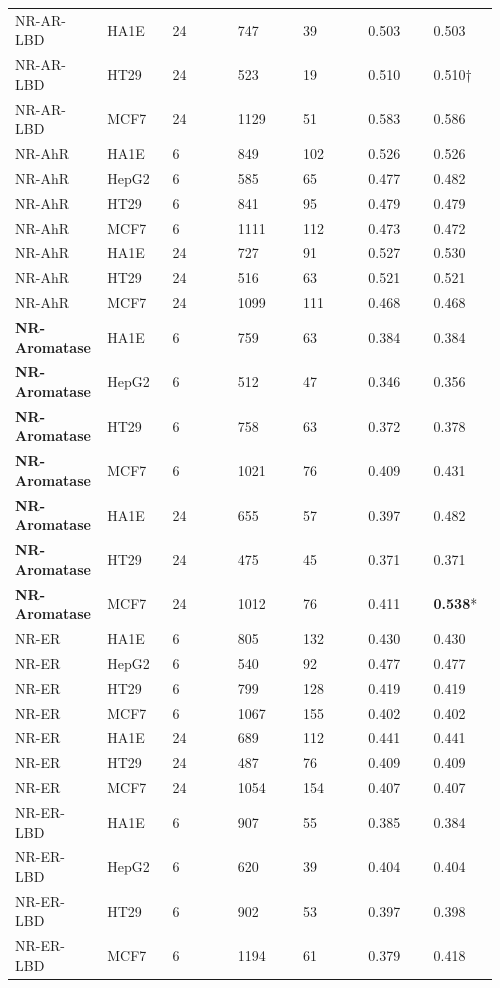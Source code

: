 \begin{longtable}{p{0.137\linewidth}p{0.137\linewidth}p{0.137\linewidth}p{0.137\linewidth}p{0.137\linewidth}p{0.137\linewidth}p{0.137\linewidth}}
NR-AR-LBD & HA1E & 24 & 747 & 39 & 0.503 & 0.503 \\
NR-AR-LBD & HT29 & 24 & 523 & 19 & 0.510 & 0.510† \\
NR-AR-LBD & MCF7 & 24 & 1129 & 51 & 0.583 & 0.586 \\
NR-AhR & HA1E & 6 & 849 & 102 & 0.526 & 0.526 \\
NR-AhR & HepG2 & 6 & 585 & 65 & 0.477 & 0.482 \\
NR-AhR & HT29 & 6 & 841 & 95 & 0.479 & 0.479 \\
NR-AhR & MCF7 & 6 & 1111 & 112 & 0.473 & 0.472 \\
NR-AhR & HA1E & 24 & 727 & 91 & 0.527 & 0.530 \\
NR-AhR & HT29 & 24 & 516 & 63 & 0.521 & 0.521 \\
NR-AhR & MCF7 & 24 & 1099 & 111 & 0.468 & 0.468 \\
\textbf{NR-Aromatase} & HA1E & 6 & 759 & 63 & 0.384 & 0.384 \\
\textbf{NR-Aromatase} & HepG2 & 6 & 512 & 47 & 0.346 & 0.356 \\
\textbf{NR-Aromatase} & HT29 & 6 & 758 & 63 & 0.372 & 0.378 \\
\textbf{NR-Aromatase} & MCF7 & 6 & 1021 & 76 & 0.409 & 0.431 \\
\textbf{NR-Aromatase} & HA1E & 24 & 655 & 57 & 0.397 & 0.482 \\
\textbf{NR-Aromatase} & HT29 & 24 & 475 & 45 & 0.371 & 0.371 \\
\textbf{NR-Aromatase} & MCF7 & 24 & 1012 & 76 & 0.411 & \textbf{0.538}* \\
NR-ER & HA1E & 6 & 805 & 132 & 0.430 & 0.430 \\
NR-ER & HepG2 & 6 & 540 & 92 & 0.477 & 0.477 \\
NR-ER & HT29 & 6 & 799 & 128 & 0.419 & 0.419 \\
NR-ER & MCF7 & 6 & 1067 & 155 & 0.402 & 0.402 \\
NR-ER & HA1E & 24 & 689 & 112 & 0.441 & 0.441 \\
NR-ER & HT29 & 24 & 487 & 76 & 0.409 & 0.409 \\
NR-ER & MCF7 & 24 & 1054 & 154 & 0.407 & 0.407 \\
NR-ER-LBD & HA1E & 6 & 907 & 55 & 0.385 & 0.384 \\
NR-ER-LBD & HepG2 & 6 & 620 & 39 & 0.404 & 0.404 \\
NR-ER-LBD & HT29 & 6 & 902 & 53 & 0.397 & 0.398 \\
NR-ER-LBD & MCF7 & 6 & 1194 & 61 & 0.379 & 0.418 \\

\end{longtable}
